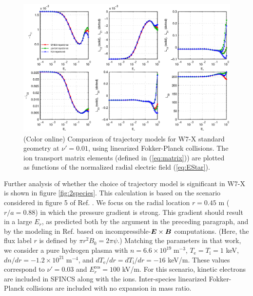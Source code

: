 \documentclass[12pt]{revtex4}
\newcommand{\vect}[1]{\mbox{\boldmath $#1$}}
\newcommand{\Ti}{T_{\mathrm{i}}}
\newcommand{\Te}{T_{\mathrm{e}}}
\newcommand{\Erres}{E_r^{\mathrm{res}}}
\begin{document}
\begin{figure}[h!]
\includegraphics{m20131205_05_plotSFINCSFortranErComparisonForPaper_W7X.eps}
\caption{(Color online) Comparison of trajectory models for W7-X standard geometry at $\nu' = 0.01$,
using linearized Fokker-Planck collisions.
The ion transport matrix elements (defined in (\ref{eq:matrix})) are plotted as functions
of the normalized radial electric field (\ref{eq:EStar}).
\label{fig:ErComparison_W7X}}
\end{figure}



Further analysis of whether the choice of trajectory model is significant in W7-X
is shown in figure  \ref{fig:2species}.
This calculation is based on the scenario considered in figure 5 of Ref. \cite{Turkin}. 
We focus on the radial location $r=0.45$ m ($r/a=0.88$)
in which the pressure gradient is strong.  This gradient should result in a large $E_r$, as predicted 
both by the argument in the preceding paragraph, and by
the modeling in Ref. \cite{Turkin} based on incompressible-$\vect{E}\times\vect{B}$ computations.
(Here, the flux label $r$ is defined by $\pi r^2 B_0 = 2 \pi \psi$.)
Matching the parameters in that work, we consider a pure hydrogen plasma with $n=6.6\times 10^{19}\; \mathrm{m}^{-3}$,
$\Te=\Ti=1$ keV, $dn/dr = -1.2\times 10^{21} \;\mathrm{m}^{-4}$, and $d\Te/dr=d\Ti/dr = -16$ keV/m.
These values correspond to $\nu'=0.03$ and $\Erres = 100 $ kV/m.
For this scenario, kinetic electrons are included in SFINCS along with the ions.
Inter-species linearized Fokker-Planck collisions are included with no expansion in mass ratio.
\end{document}
